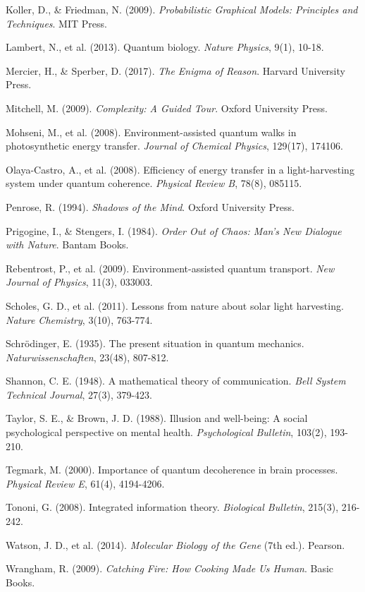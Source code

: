 \documentclass[12pt,a4paper]{article}
\begin{document}
\begin{thebibliography}{99}
Koller, D., \& Friedman, N. (2009). \textit{Probabilistic Graphical Models: Principles and Techniques}. MIT Press.

Lambert, N., et al. (2013). Quantum biology. \textit{Nature Physics}, 9(1), 10-18.

Mercier, H., \& Sperber, D. (2017). \textit{The Enigma of Reason}. Harvard University Press.

Mitchell, M. (2009). \textit{Complexity: A Guided Tour}. Oxford University Press.

Mohseni, M., et al. (2008). Environment-assisted quantum walks in photosynthetic energy transfer. \textit{Journal of Chemical Physics}, 129(17), 174106.

Olaya-Castro, A., et al. (2008). Efficiency of energy transfer in a light-harvesting system under quantum coherence. \textit{Physical Review B}, 78(8), 085115.

Penrose, R. (1994). \textit{Shadows of the Mind}. Oxford University Press.

Prigogine, I., \& Stengers, I. (1984). \textit{Order Out of Chaos: Man's New Dialogue with Nature}. Bantam Books.

Rebentrost, P., et al. (2009). Environment-assisted quantum transport. \textit{New Journal of Physics}, 11(3), 033003.

Scholes, G. D., et al. (2011). Lessons from nature about solar light harvesting. \textit{Nature Chemistry}, 3(10), 763-774.

Schrödinger, E. (1935). The present situation in quantum mechanics. \textit{Naturwissenschaften}, 23(48), 807-812.

Shannon, C. E. (1948). A mathematical theory of communication. \textit{Bell System Technical Journal}, 27(3), 379-423.

Taylor, S. E., \& Brown, J. D. (1988). Illusion and well-being: A social psychological perspective on mental health. \textit{Psychological Bulletin}, 103(2), 193-210.

Tegmark, M. (2000). Importance of quantum decoherence in brain processes. \textit{Physical Review E}, 61(4), 4194-4206.

Tononi, G. (2008). Integrated information theory. \textit{Biological Bulletin}, 215(3), 216-242.

Watson, J. D., et al. (2014). \textit{Molecular Biology of the Gene} (7th ed.). Pearson.

Wrangham, R. (2009). \textit{Catching Fire: How Cooking Made Us Human}. Basic Books.

\end{thebibliography}
\end{document}
